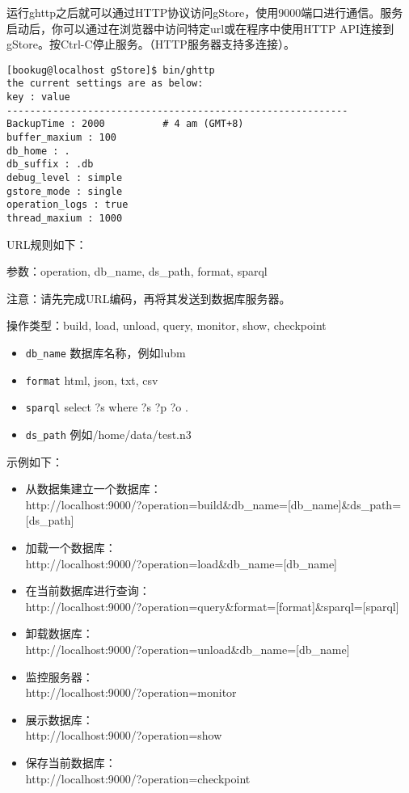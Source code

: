 \documentclass[titlepage, a4paper, 12pt]{article}
\begin{document}
运行ghttp之后就可以通过HTTP协议访问gStore，使用9000端口进行通信。服务启动后，你可以通过在浏览器中访问特定url或在程序中使用HTTP API连接到gStore。按Ctrl-C停止服务。（HTTP服务器支持多连接）。

\begin{verbatim}
[bookug@localhost gStore]$ bin/ghttp
the current settings are as below:
key : value
-----------------------------------------------------------
BackupTime : 2000          # 4 am (GMT+8)
buffer_maxium : 100
db_home : .
db_suffix : .db
debug_level : simple
gstore_mode : single
operation_logs : true
thread_maxium : 1000
\end{verbatim}

URL规则如下：  

参数：operation, db\_name, ds\_path, format, sparql

注意：请先完成URL编码，再将其发送到数据库服务器。

操作类型：build, load, unload, query, monitor, show, checkpoint

\begin{itemize}
	\item
	\texttt{db\_name}  数据库名称，例如lubm
	\item
	\texttt{format} html, json, txt, csv
	\item
	\texttt{sparql} select ?s where { ?s ?p ?o . }
	\item
	\texttt{ds\_path}  例如/home/data/test.n3
\end{itemize}

示例如下：

\begin{itemize}
	\item
	从数据集建立一个数据库：\\
	http://localhost:9000/?operation=build\&db\_name=[db\_name]\&ds\_path=[ds\_path]
	\item 
	加载一个数据库：\\
	http://localhost:9000/?operation=load\&db\_name=[db\_name]
	\item 
	在当前数据库进行查询：\\
	http://localhost:9000/?operation=query\&format=[format]\&sparql=[sparql]
	\item 
	卸载数据库：\\
	http://localhost:9000/?operation=unload\&db\_name=[db\_name]
	\item 
	监控服务器：\\
	http://localhost:9000/?operation=monitor
	\item 
	展示数据库：\\
	http://localhost:9000/?operation=show
	\item
	保存当前数据库：\\
	http://localhost:9000/?operation=checkpoint
\end{itemize}
\end{document}
